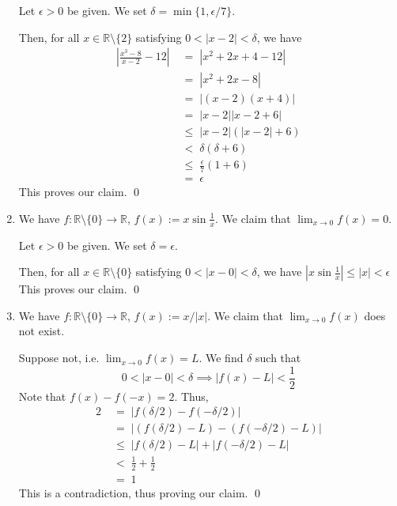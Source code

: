 \documentclass[10pt]{article}
\begin{document}
\begin{enumerate}
                Let $\epsilon > 0$ be given.
                We set $\delta = \min\{1, \epsilon/7\}$.

                Then, for all $x \in \mathbb{R}\setminus\{2\}$ satisfying $0 < |x-2| < \delta$, we have
                \begin{align*}
                \left| \frac{x^3 - 8}{x - 2} - 12\right| \;&=\; \left| x^2 + 2x + 4 - 12 \right| \\
                        \;&=\; \left| x^2 + 2x - 8 \right| \\
                        \;&=\; \left| (x - 2)(x + 4)\right| \\
                        \;&=\; \left| x - 2 \right| \left|  x - 2 + 6\right| \\
                        \;&\le\; \left| x - 2 \right| (\left| x - 2 \right| + 6) \\
                        \;&<\; \delta (\delta + 6) \\
                        \;&\le\; \frac{\epsilon}{7} (1 + 6) \\
                        \;&=\; \epsilon
                \end{align*}
                This proves our claim. \qed

                \item We have $f\colon \mathbb{R}\setminus\{0\} \to \mathbb{R}$, $f(x) := x\sin{\frac{1}{x}}$.
                We claim that $\lim_{x\to 0} f(x) = 0$.

                Let $\epsilon > 0$ be given.
                We set $\delta = \epsilon$.

                Then, for all $x \in \mathbb{R}\setminus\{0\}$ satisfying $0 < |x - 0| < \delta$, we have
                $
                \left| x\sin\frac{1}{x} \right| \le |x| < \epsilon
                $
                This proves our claim. \qed

                \item We have $f\colon \mathbb{R}\setminus\{0\} \to \mathbb{R}$, $f(x) := x/|x|$.
                We claim that $\lim_{x\to 0} f(x)$ does not exist.

                Suppose not, i.e. $\lim_{x\to 0} f(x) = L$.
                We find $\delta$ such that
                \[
                0 < |x - 0| < \delta \implies |f(x) - L| < \frac{1}{2}
                \]
                Note that $f(x) - f(-x) = 2$. Thus,
                \begin{align*}
                2 \;&=\; \left| f(\delta/2) - f(-\delta/2) \right| \\
                        \;&=\; \left|  (f(\delta/2) - L) - (f(-\delta/2) - L)\right| \\
                        \;&\le\; \left|  f(\delta/2) - L\right| + \left| f(-\delta/2) - L\right| \\
                        \;&<\; \frac{1}{2} + \frac{1}{2} \\
                        \;&=\; 1
                \end{align*}
                This is a contradiction, thus proving our claim. \qed
        \end{enumerate}
        
\end{document}
